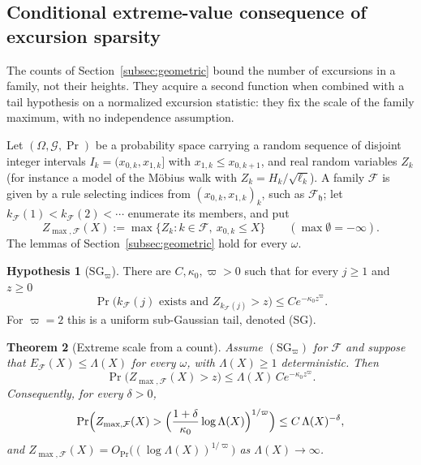\documentclass[11pt]{amsart}
\numberwithin{equation}{section}
\theoremstyle{plain}
\newtheorem{theorem}{Theorem}[section]
\theoremstyle{definition}
\newtheorem{hypothesis}[theorem]{Hypothesis}
\theoremstyle{remark}
\newcommand{\F}{\mathcal{F}}
\begin{document}
\subsection{Conditional extreme-value consequence of excursion sparsity}
\label{subsec:extreme}

The counts of Section~\ref{subsec:geometric} bound the number of excursions
in a family, not their heights. They acquire a second function when combined
with a tail hypothesis on a normalized excursion statistic: they fix the
scale of the family maximum, with no independence assumption.

Let $(\Omega,\mathcal G,\Pr)$ be a probability space carrying a random
sequence of disjoint integer intervals $I_k=(x_{0,k},x_{1,k}]$ with
$x_{1,k}\le x_{0,k+1}$, and real random variables $Z_k$ (for instance a model
of the M\"obius walk with $Z_k=H_k/\sqrt{\ell_k}$). A family $\F$ is given by
a rule selecting indices from $(x_{0,k},x_{1,k})_k$, such as $\F_{\mathfrak h}$; let
$k_\F(1)<k_\F(2)<\cdots$ enumerate its members, and put
\[
Z_{\max,\F}(X):=\max\{Z_k:k\in\F,\ x_{0,k}\le X\}\qquad(\max\emptyset=-\infty).
\]
The lemmas of Section~\ref{subsec:geometric} hold for every $\omega$.

\begin{hypothesis}[$\mathrm{SG}_\varpi$]
\label{hyp:SG}
There are $C,\kappa_0,\varpi>0$ such that for every $j\ge1$ and $z\ge0$
\[
\Pr\bigl(k_\F(j)\text{ exists and }Z_{k_\F(j)}>z\bigr)\le Ce^{-\kappa_0z^\varpi}.
\]
For $\varpi=2$ this is a uniform sub-Gaussian tail, denoted (SG).
\end{hypothesis}

\begin{theorem}[Extreme scale from a count]
\label{thm:ev-union}
Assume $(\mathrm{SG}_\varpi)$ for $\F$ and suppose that $E_\F(X)\le \Lambda(X)$ for
every $\omega$, with $\Lambda(X)\ge1$ deterministic. Then
\begin{equation}
\label{eq:ev-union}
\Pr\bigl(Z_{\max,\F}(X)>z\bigr)\le \Lambda(X)\,Ce^{-\kappa_0z^\varpi}.
\end{equation}
Consequently, for every $\delta>0$,
\begin{equation}
\label{eq:ev-scale}
\Pr\Bigl(Z_{\max,\F}(X)>\Bigl(\frac{1+\delta}{\kappa_0}\log \Lambda(X)\Bigr)^{1/\varpi}\Bigr)
\le C\,\Lambda(X)^{-\delta},
\end{equation}
and $Z_{\max,\F}(X)=O_{\Pr}\bigl((\log \Lambda(X))^{1/\varpi}\bigr)$ as $\Lambda(X)\to\infty$.
\end{theorem}
\end{document}
